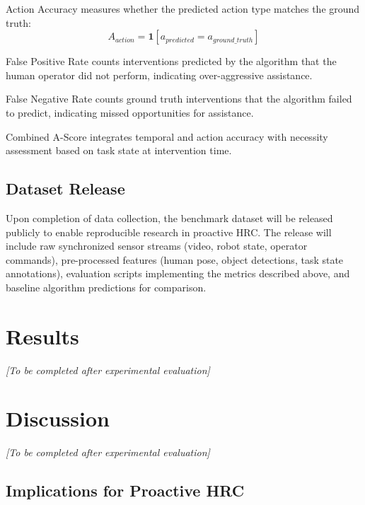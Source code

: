 \documentclass[sensors,article,submit,pdftex,moreauthors]{Definitions/mdpi}
\begin{document}
Action Accuracy measures whether the predicted action type matches the ground truth:
\begin{equation}
    A_{action} = \mathbf{1}[a_{predicted} = a_{ground\_truth}]
\end{equation}

False Positive Rate counts interventions predicted by the algorithm that the human operator did not perform, indicating over-aggressive assistance.

False Negative Rate counts ground truth interventions that the algorithm failed to predict, indicating missed opportunities for assistance.

Combined A-Score integrates temporal and action accuracy with necessity assessment based on task state at intervention time.

\subsection{Dataset Release}

Upon completion of data collection, the benchmark dataset will be released publicly to enable reproducible research in proactive HRC. The release will include raw synchronized sensor streams (video, robot state, operator commands), pre-processed features (human pose, object detections, task state annotations), evaluation scripts implementing the metrics described above, and baseline algorithm predictions for comparison.

\section{Results}

\textit{[To be completed after experimental evaluation]}

\section{Discussion}

\textit{[To be completed after experimental evaluation]}

\subsection{Implications for Proactive HRC}
\end{document}
